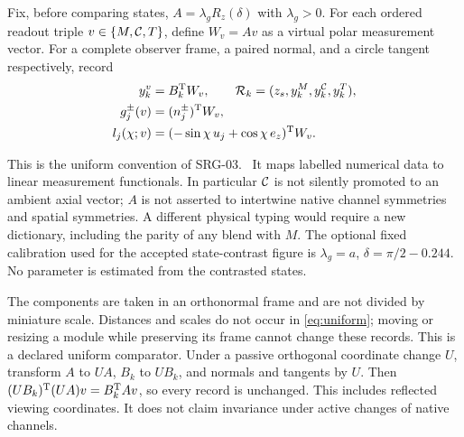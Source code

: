 \begin{definition}\label{def:dictionary}
Fix, before comparing states, $A=\lambda_gR_z(\delta)$ with $\lambda_g>0$. For each ordered readout triple $v\in\{M,\mathcal C,T\}$, define $W_v=Av$ as a virtual polar measurement vector. For a complete observer frame, a paired normal, and a circle tangent respectively, record
\begin{equation}\label{eq:uniform}
\begin{aligned}
y_k^v&=B_k^{\mathrm T} W_v,\qquad \mathcal R_k=(z_s,y_k^M,y_k^{\mathcal C},y_k^T),\\
g_j^\pm(v)&=(n_j^\pm)^{\mathrm T} W_v,\\
l_j(\chi;v)&=(-\sin\chi\,u_j+\cos\chi\,e_z)^{\mathrm T} W_v.
\end{aligned}
\end{equation}
\end{definition}
This is the uniform convention of SRG-03.~\cite[Eqns.~(3)--(6)]{SRG03} It maps labelled numerical data to linear measurement functionals. In particular $\mathcal C$ is not silently promoted to an ambient axial vector; $A$ is not asserted to intertwine native channel symmetries and spatial symmetries. A different physical typing would require a new dictionary, including the parity of any blend with $M$. The optional fixed calibration used for the accepted state-contrast figure is $\lambda_g=a$, $\delta=\pi/2-0.244$. No parameter is estimated from the contrasted states.

The components are taken in an orthonormal frame and are not divided by miniature scale. Distances and scales do not occur in \eqref{eq:uniform}; moving or resizing a module while preserving its frame cannot change these records. This is a declared uniform comparator. Under a passive orthogonal coordinate change $U$, transform $A$ to $UA$, $B_k$ to $UB_k$, and normals and tangents by $U$. Then $(UB_k)^{\mathrm T}(UA)v=B_k^{\mathrm T} Av$, so every record is unchanged. This includes reflected viewing coordinates. It does not claim invariance under active changes of native channels.

